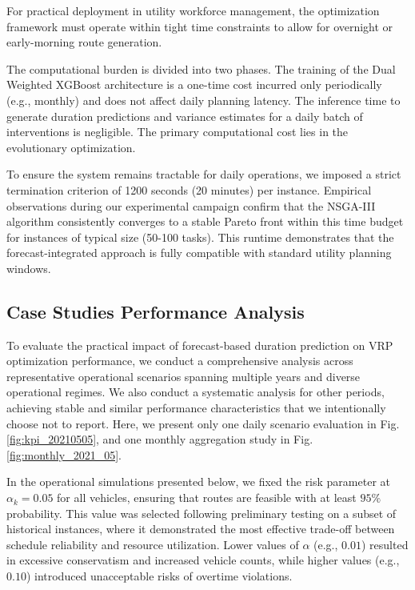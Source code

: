 \documentclass[preprint,12pt]{elsarticle}
\begin{document}

For practical deployment in utility workforce management, the optimization framework must operate within tight time constraints to allow for overnight or early-morning route generation. 

The computational burden is divided into two phases. The training of the Dual Weighted XGBoost architecture is a one-time cost incurred only periodically (e.g., monthly) and does not affect daily planning latency. The inference time to generate duration predictions and variance estimates for a daily batch of interventions is negligible. The primary computational cost lies in the evolutionary optimization.


To ensure the system remains tractable for daily operations, we imposed a strict termination criterion of 1200 seconds (20 minutes) per instance. Empirical observations during our experimental campaign confirm that the NSGA-III algorithm consistently converges to a stable Pareto front within this time budget for instances of typical size (50-100 tasks). This runtime demonstrates that the forecast-integrated approach is fully compatible with standard utility planning windows.


\subsection{Case Studies Performance Analysis}

To evaluate the practical impact of forecast-based duration prediction on VRP optimization performance, we conduct a comprehensive analysis across representative operational scenarios spanning multiple years and diverse operational regimes.  We also conduct a systematic analysis for other periods, achieving stable and similar performance characteristics that we intentionally choose not to report. Here, we present only one daily scenario evaluation in Fig. \ref{fig:kpi_20210505}, and one monthly aggregation study in Fig. \ref{fig:monthly_2021_05}.

In the operational simulations presented below, we fixed the risk parameter at $\alpha_k = 0.05$ for all vehicles, ensuring that routes are feasible with at least $95\%$ probability. This value was selected following preliminary testing on a subset of historical instances, where it demonstrated the most effective trade-off between schedule reliability and resource utilization. Lower values of $\alpha$ (e.g., $0.01$) resulted in excessive conservatism and increased vehicle counts, while higher values (e.g., $0.10$) introduced unacceptable risks of overtime violations.
\end{document}
